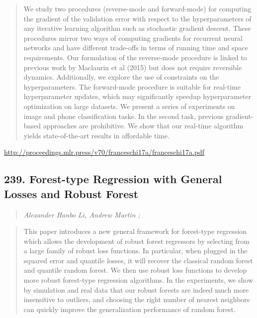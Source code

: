 \documentclass{article}
\begin{document}
\begin{quote}
    We study two procedures (reverse-mode and forward-mode) for computing the gradient of the validation error with respect to the hyperparameters of any iterative learning algorithm such as stochastic gradient descent. These procedures mirror two ways of computing gradients for recurrent neural networks and have different trade-offs in terms of running time and space requirements. Our formulation of the reverse-mode procedure is linked to previous work by Maclaurin et al (2015) but does not require reversible dynamics. Additionally, we explore the use of constraints on the hyperparameters. The forward-mode procedure is suitable for real-time hyperparameter updates, which may significantly speedup hyperparameter optimization on large datasets. We present a series of experiments on image and phone classification tasks. In the second task, previous gradient-based approaches are prohibitive. We show that our real-time algorithm yields state-of-the-art results in affordable time.  \end{quote}

\href{http://proceedings.mlr.press/v70/franceschi17a/franceschi17a.pdf}{http://proceedings.mlr.press/v70/franceschi17a/franceschi17a.pdf}

\subsection{239. Forest-type Regression with General Losses and Robust Forest}

\begin{quote}
\footnotesize{\textit{Alexander Hanbo Li, Andrew Martin ;}}
\end{quote}

\begin{quote}
    This paper introduces a new general framework for forest-type regression which allows the development of robust forest regressors by selecting from a large family of robust loss functions. In particular, when plugged in the squared error and quantile losses, it will recover the classical random forest and quantile random forest. We then use robust loss functions to develop more robust forest-type regression algorithms. In the experiments, we show by simulation and real data that our robust forests are indeed much more insensitive to outliers, and choosing the right number of nearest neighbors can quickly improve the generalization performance of random forest.  \end{quote}
\end{document}
